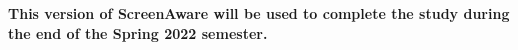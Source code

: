 \documentclass[12pt, title page, manuscript, nonacm]{acmart}
\begin{document}
\par \textbf{This version of ScreenAware will be used to complete the study during the end of the Spring 2022 semester.}
\end{document}
